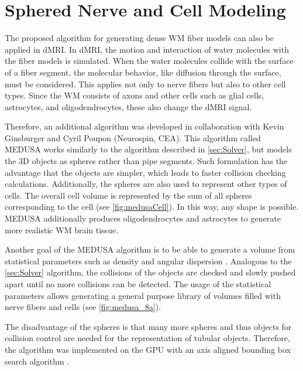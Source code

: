 \section{Sphered Nerve and Cell Modeling}
\label{sec:medusa}
%
The proposed algorithm for generating dense \ac{WM} fiber models can also be applied in \ac{dMRI}.
In \ac{dMRI}, the motion and interaction of water molecules with the fiber models is simulated.
When the water molecules collide with the surface of a fiber segment, the molecular behavior, like diffusion through the surface, must be considered.
This applies not only to nerve fibers but also to other cell types.
Since the WM consists of axons and other cells such as glial cells, astrocytes, and oligodendrocytes, these also change the \ac{dMRI} signal.
\par
% 
Therefore, an additional algorithm was developed in collaboration with Kevin Ginsburger and Cyril Poupon (Neurospin, \ac{CEA}).
This algorithm called \ac{MEDUSA} \cite{Ginsburger2019} works similarly to the algorithm described in \cref{sec:Solver}, but models the 3D objects as spheres rather than pipe segments.
Such formulation has the advantage that the objects are simpler,
which leads to faster collision checking calculations.
Additionally, the spheres are also used to represent other types of cells.
The overall cell volume is represented by the sum of all spheres corresponding to the cell (see \cref{fig:medusaCell}).
In this way, any shape is possible.
\ac{MEDUSA} additionally produces oligodendrocytes and astrocytes to generate more realistic \ac{WM} brain tissue.
\par
% 
Another goal of the \ac{MEDUSA} algorithm is to be able to generate a volume from statistical parameters such as density and angular dispersion \cite{Ginsburger2019, ginsburgerDis2019}.
Analogous to the \cref{sec:Solver} algorithm, the collisions of the objects are checked and slowly pushed apart until no more collisions can be detected.
The usage of the statistical parameters allows generating a general purpose library of volumes filled with nerve fibers and cells (see \cref{fig:medusa_8a}).
\par
% 
The disadvantage of the spheres is that many more spheres and thus objects for collision control are needed for the representation of tubular objects.
Therefore, the algorithm was implemented on the \ac{GPU} with an axis aligned bounding box search algorithm \cite{Karras2012}.
% 
% 
%
